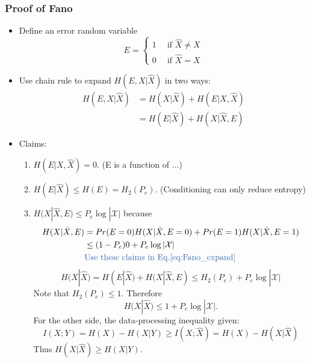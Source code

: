 \documentclass[12pt]{article}
\begin{document}
\subsubsection{Proof of Fano}
\begin{itemize}
    \item Define an error random variable 
    \[
    E = \left \{
    \begin{array}{cc}
        1 & \,\textrm{  if } \hat{X} \not = X \\
        0 & \,\textrm{  if } \hat{X}  = X
    \end{array}
    \right.
    \]
    \item Use chain rule to expand $H(E,X|\hat{X})$ in two ways:
    \begin{align}
        H(E,X|\hat{X}) &= H(X|\hat{X}) + H(E|X,\hat{X}) \label{eq:Fano_expand}\\
        &=H(E|\hat{X}) + H(X|\hat{X},E) \nonumber
    \end{align}
    \item Claims:
    \begin{enumerate}
        \item $H(E|X,\hat{X}) = 0$. (E is a function of ...)
        \item $H(E|\hat{X}) \le H(E) = H_2(P_e)$. (Conditioning can only reduce entropy)
        \item $H(X|\hat{X},E) \le P_e\log|\mathcal{X}|$ because
        \begin{align*}
            H(X|\hat{X},E) &= Pr(E=0)H(X|\hat{X},E=0) +Pr(E=1)H(X|\hat{X},E=1) \\
            &\le (1-P_e)0 + P_e\log|\mathcal{X}| \\
            & \textrm{\textcolor{blue1}{Use these claims in Eq.\ref{eq:Fano_expand}}}
        \end{align*}
        \[
         H(X|\hat{X}) = H(E|\hat{X}) + H(X|\hat{X},E) \le H_2(P_e) + P_e\log|\mathcal{X}|
        \]
        Note that $H_2(P_e) \le 1$. Therefore
        \[
        H(X|\hat{X}) \le 1 + P_e\log|\mathcal{X}|.
        \]
        For the other side, the data-processing inequality given:
        \[
        I(X;Y) = H(X) -H(X|Y) \ge I(X;\hat{X}) = H(X) - H(X|\hat{X})
        \]
        Thus $H(X|\hat{X}) \ge H(X|Y)$.
    \end{enumerate}
\end{itemize}
\end{document}
